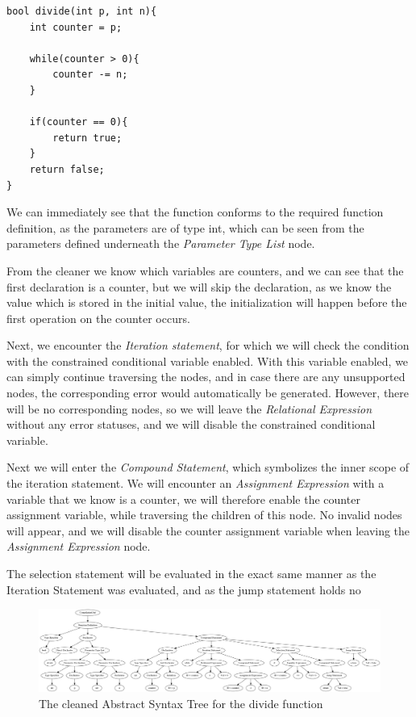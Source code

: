 \documentclass[12pt]{thesis}
\begin{document}
\begin{lstlisting}[style=CStyle, caption={Example of a ready to evaluate function}, label={lst:ready to eval}]
bool divide(int p, int n){
	int counter = p;
	
	while(counter > 0){
		counter -= n;
	}
	
	if(counter == 0){
		return true;
	}
	return false;
}
\end{lstlisting}

We can immediately see that the function conforms to the required function definition, as the parameters are of type int, which can be seen from the parameters defined underneath the \textit{Parameter Type List} node.

From the cleaner we know which variables are counters, and we can see that the first declaration is a counter, but we will skip the declaration, as we know the value which is stored in the initial value, the initialization will happen before the first operation on the counter occurs. 

Next, we encounter the \textit{Iteration statement}, for which we will check the condition with the constrained conditional variable enabled. With this variable enabled, we can simply continue traversing the nodes, and in case there are any unsupported nodes, the corresponding error would automatically be generated. However, there will be no corresponding nodes, so we will leave the \textit{Relational Expression} without any error statuses, and we will disable the constrained conditional variable. 

Next we will enter the \textit{Compound Statement}, which symbolizes the inner scope of the iteration statement. We will encounter an \textit{Assignment Expression} with a variable that we know is a counter, we will therefore enable the counter assignment variable, while traversing the children of this node. No invalid nodes will appear, and we will disable the counter assignment variable when leaving the \textit{Assignment Expression} node. 

The selection statement will be evaluated in the exact same manner as the Iteration Statement was evaluated, and as the jump statement holds no 

\begin{landscape}
	\vspace*{\fill}
	\begin{figure}[h]
		\centering
		\includegraphics[width=\linewidth]{divide_cleaned}
		\caption{The cleaned Abstract Syntax Tree for the divide function}
		\label{fig:divide_cleaned}
	\end{figure}
	\vspace*{\fill}
\end{landscape}
\end{document}
